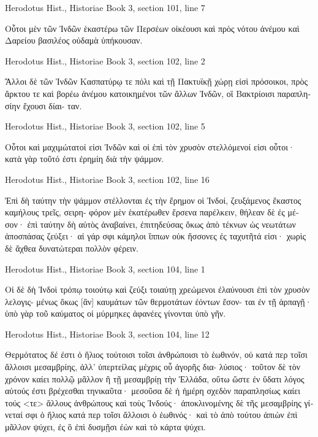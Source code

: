 \documentclass[12pt,letterpaper,twoside,final]{memoir}
\begin{document}
\begin{greek}
Herodotus Hist., Historiae 
Book 3, section 101, line 7

                                        Οὗτοι μὲν τῶν Ἰνδῶν 
ἑκαστέρω τῶν Περσέων οἰκέουσι καὶ πρὸς νότου ἀνέμου 
καὶ Δαρείου βασιλέος οὐδαμὰ ὑπήκουσαν. 



Herodotus Hist., Historiae 
Book 3, section 102, line 2

                                               Ἄλλοι δὲ τῶν 
Ἰνδῶν Κασπατύρῳ τε πόλι καὶ τῇ Πακτυϊκῇ χώρῃ εἰσὶ 
πρόσοικοι, πρὸς ἄρκτου τε καὶ βορέω ἀνέμου κατοικημένοι 
τῶν ἄλλων Ἰνδῶν, οἳ Βακτρίοισι παραπλησίην ἔχουσι δίαι-
ταν. 



Herodotus Hist., Historiae 
Book 3, section 102, line 5

     Οὗτοι καὶ μαχιμώτατοί εἰσι Ἰνδῶν καὶ οἱ ἐπὶ τὸν 
χρυσὸν στελλόμενοί εἰσι οὗτοι· κατὰ γὰρ τοῦτό ἐστι ἐρημίη 
διὰ τὴν ψάμμον. 



Herodotus Hist., Historiae 
Book 3, section 102, line 16

           Ἐπὶ δὴ ταύτην τὴν ψάμμον στέλλονται ἐς τὴν 
ἔρημον οἱ Ἰνδοί, ζευξάμενος ἕκαστος καμήλους τρεῖς, σειρη-  
φόρον μὲν ἑκατέρωθεν ἔρσενα παρέλκειν, θήλεαν δὲ ἐς 
μέσον· ἐπὶ ταύτην δὴ αὐτὸς ἀναβαίνει, ἐπιτηδεύσας ὅκως 
ἀπὸ τέκνων ὡς νεωτάτων ἀποσπάσας ζεύξει· αἱ γάρ σφι 
κάμηλοι ἵππων οὐκ ἥσσονες ἐς ταχυτῆτά εἰσι· χωρὶς δὲ 
ἄχθεα δυνατώτεραι πολλὸν φέρειν. 



Herodotus Hist., Historiae 
Book 3, section 104, line 1

                          Οἱ δὲ δὴ Ἰνδοὶ τρόπῳ τοιούτῳ καὶ 
ζεύξι τοιαύτῃ χρεώμενοι ἐλαύνουσι ἐπὶ τὸν χρυσὸν λελογις-
μένως ὅκως [ἂν] καυμάτων τῶν θερμοτάτων ἐόντων ἔσον-
ται ἐν τῇ ἁρπαγῇ· ὑπὸ γὰρ τοῦ καύματος οἱ μύρμηκες 
ἀφανέες γίνονται ὑπὸ γῆν. 



Herodotus Hist., Historiae 
Book 3, section 104, line 12

                                Θερμότατος δέ ἐστι ὁ ἥλιος 
τούτοισι τοῖσι ἀνθρώποισι τὸ ἑωθινόν, οὐ κατά περ τοῖσι 
ἄλλοισι μεσαμβρίης, ἀλλ' ὑπερτείλας μέχρις οὗ ἀγορῆς δια-
λύσιος· τοῦτον δὲ τὸν χρόνον καίει πολλῷ μᾶλλον ἢ τῇ 
μεσαμβρίῃ τὴν Ἑλλάδα, οὕτω ὥστε ἐν ὕδατι λόγος αὐτούς 
ἐστι βρέχεσθαι τηνικαῦτα· μεσοῦσα δὲ ἡ ἡμέρη σχεδὸν 
παραπλησίως καίει τούς <τε> ἄλλους ἀνθρώπους καὶ τοὺς 
Ἰνδούς· ἀποκλινομένης δὲ τῆς μεσαμβρίης γίνεταί σφι ὁ   
ἥλιος κατά περ τοῖσι ἄλλοισι ὁ ἑωθινός· καὶ τὸ ἀπὸ τούτου 
ἀπιὼν ἐπὶ μᾶλλον ψύχει, ἐς ὃ ἐπὶ δυσμῇσι ἐὼν καὶ τὸ 
κάρτα ψύχει. 




\end{greek}
\end{document}
